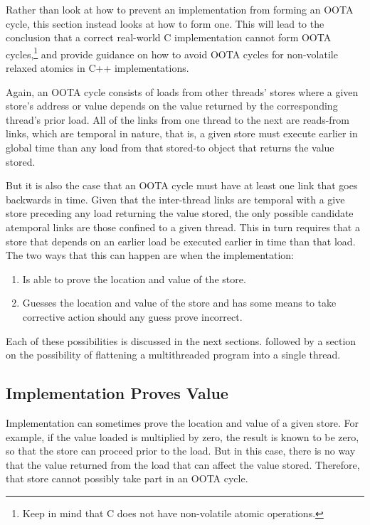 \documentclass[10]{article}
\begin{document}
Rather than look at how to prevent an implementation from forming an
OOTA cycle, this section instead looks at how to form one.
This will lead to the conclusion that a correct real-world C
implementation cannot form OOTA cycles,\footnote{
	Keep in mind that C does not have non-volatile atomic
	operations.}
and provide guidance on how to avoid OOTA cycles for non-volatile relaxed
atomics in C++ implementations.

Again, an OOTA cycle consists of loads from other threads' stores where
a given store's address or value depends on the value returned by
the corresponding thread's prior load.
All of the links from one thread to the next are reads-from links, which
are temporal in nature, that is, a given store must execute earlier in
global time than any load from that stored-to object that returns the
value stored.

But it is also the case that an OOTA cycle must have at least one link
that goes backwards in time.
Given that the inter-thread links are temporal with a give store preceding
any load returning the value stored, the only possible candidate atemporal
links are those confined to a given thread.
This in turn requires that a store that depends on an earlier load
be executed earlier in time than that load.
The two ways that this can happen are when the implementation:

\begin{enumerate}
\item	Is able to prove the location and value of the store.
\item	Guesses the location and value of the store and has some means
	to take corrective action should any guess prove incorrect.
\end{enumerate}

Each of these possibilities is discussed in the next sections.
followed by a section on the possibility of flattening a multithreaded
program into a single thread.

\subsection{Implementation Proves Value}
\label{sec:Implementation Proves Value}

Implementation can sometimes prove the location and value of a given
store.
For example, if the value loaded is multiplied by zero, the result
is known to be zero, so that the store can proceed prior to the load.
But in this case, there is no way that the value returned from
the load that can affect the value stored.
Therefore, that store cannot possibly take part in an OOTA cycle.
\end{document}
